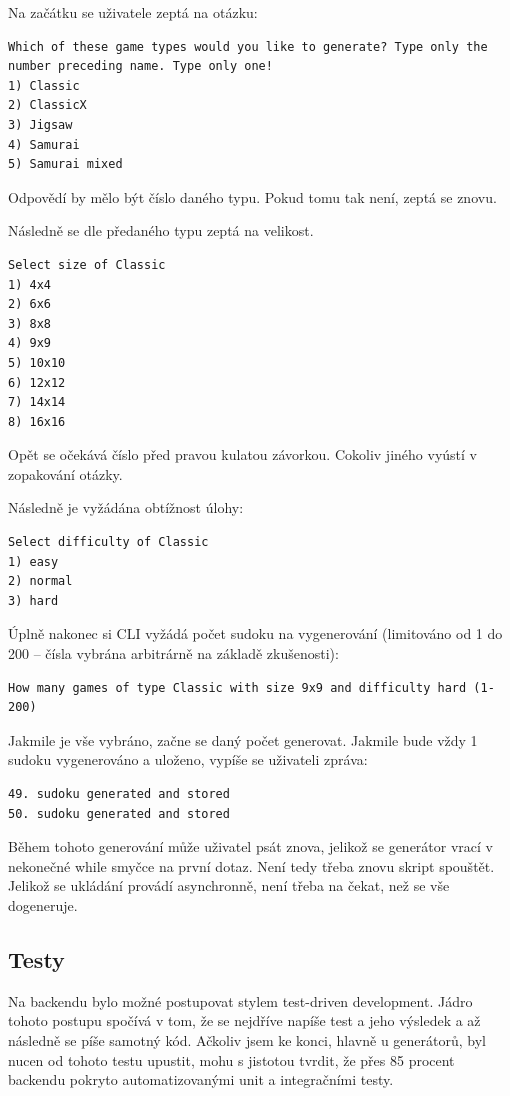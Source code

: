 \documentclass[a4paper,oneside,12pt]{report}
\begin{document}
Na začátku se uživatele zeptá na otázku: 
\begin{lstlisting}[breaklines, basicstyle=\tiny]
Which of these game types would you like to generate? Type only the number preceding name. Type only one!
1) Classic
2) ClassicX
3) Jigsaw
4) Samurai
5) Samurai mixed
\end{lstlisting}

Odpovědí by mělo být číslo daného typu. Pokud tomu tak není, zeptá se znovu. 

Následně se dle předaného typu zeptá na velikost. 
\begin{lstlisting}[breaklines, basicstyle=\tiny]
Select size of Classic
1) 4x4
2) 6x6
3) 8x8
4) 9x9
5) 10x10
6) 12x12
7) 14x14
8) 16x16
\end{lstlisting}
Opět se očekává číslo před pravou kulatou závorkou. Cokoliv jiného vyústí v zopakování otázky.

Následně je vyžádána obtížnost úlohy:
\begin{lstlisting}[breaklines, basicstyle=\tiny]
Select difficulty of Classic
1) easy
2) normal
3) hard
\end{lstlisting}

Úplně nakonec si CLI vyžádá počet sudoku na vygenerování (limitováno od 1 do 200 -- čísla vybrána arbitrárně na základě zkušenosti): 
\begin{lstlisting}[breaklines, basicstyle=\tiny]
How many games of type Classic with size 9x9 and difficulty hard (1-200)
\end{lstlisting}

Jakmile je vše vybráno, začne se daný počet generovat. Jakmile bude vždy 1 sudoku vygenerováno a uloženo, vypíše se uživateli zpráva:
\begin{lstlisting}[breaklines, basicstyle=\tiny]
49. sudoku generated and stored
50. sudoku generated and stored
\end{lstlisting}

Během tohoto generování může uživatel psát znova, jelikož se generátor vrací v nekonečné while smyčce na první dotaz. Není tedy třeba znovu skript spouštět. Jelikož se ukládání provádí asynchronně, není třeba na čekat, než se vše dogeneruje.

\subsection{Testy}
Na backendu bylo možné postupovat stylem test-driven development. Jádro tohoto postupu spočívá v tom, že se nejdříve napíše test a jeho výsledek a až následně se píše samotný kód. Ačkoliv jsem ke konci, hlavně u generátorů, byl nucen od tohoto testu upustit, mohu s jistotou tvrdit, že přes 85 procent backendu pokryto automatizovanými unit a integračními testy. 
\end{document}
